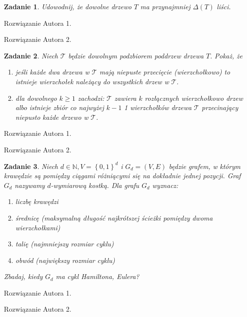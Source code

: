 \documentclass{mwart}
\newcommand{\N}{\mathbb{N}}
\newcommand{\T}{\mathcal{T}}
\newtheorem{zad}{Zadanie}[section]
\begin{document}
\begin{zad}
    Udowodnij, że dowolne drzewo $T$ ma przynajmniej $\Delta(T)$ liści.
\end{zad}
\begin{mdframed}
    Rozwiązanie Autora 1.
\end{mdframed}
\begin{mdframed}
    Rozwiązanie Autora 2.
\end{mdframed}

\begin{zad}
    Niech $\T$ będzie dowolnym podzbiorem poddrzew drzewa $T$. Pokaż, że
    \begin{enumerate}
        \item jeśli każde dwa drzewa w $\T$ mają niepuste przecięcie (wierzchołkowo) to istnieje
              wierzchołek należący do wszystkich drzew w $\T$.

        \item dla dowolnego $k \geq 1$ zachodzi: $\T$ zawiera $k$ rozłącznych wierzchołkowo drzew albo
              istnieje zbiór co najwyżej $k-1$ 1 wierzchołków drzewa $\T$ przecinający niepusto każde
              drzewo w $\T$.
    \end{enumerate}
\end{zad}
\begin{mdframed}
    Rozwiązanie Autora 1.
\end{mdframed}
\begin{mdframed}
    Rozwiązanie Autora 2.
\end{mdframed}



\begin{zad}
    Niech $d \in \N, V = \left\{0,1\right\}^d$ i $G_d=(V,E)$ będzie grafem, w którym krawędzie
    są pomiędzy ciągami różniącymi się na dokładnie jednej pozycji. Graf $G_d$ nazywamy
    $d$-wymiarową kostką. Dla grafu $G_d$ wyznacz:
    \begin{enumerate}
        \item liczbę krawędzi
        \item średnicę (maksymalną długość najkrótszej ścieżki pomiędzy dwoma wierzchołkami)
        \item talię (najmniejszy rozmiar cyklu)
        \item obwód (największy rozmiar cyklu)
    \end{enumerate}
    Zbadaj, kiedy $G_d$ ma cykl Hamiltona, Eulera?
\end{zad}
\begin{mdframed}
    Rozwiązanie Autora 1.
\end{mdframed}
\begin{mdframed}
    Rozwiązanie Autora 2.
\end{mdframed}
\end{document}

